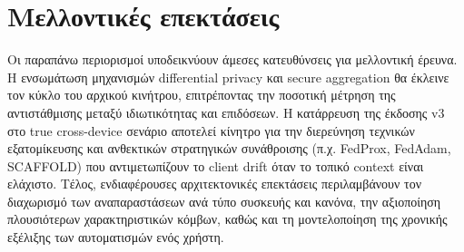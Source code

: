 \section{Μελλοντικές επεκτάσεις}\label{sec:concl-future}
Οι παραπάνω περιορισμοί υποδεικνύουν άμεσες κατευθύνσεις για μελλοντική έρευνα. Η ενσωμάτωση μηχανισμών differential privacy και secure aggregation θα έκλεινε τον κύκλο του αρχικού κινήτρου, επιτρέποντας την ποσοτική μέτρηση της αντιστάθμισης μεταξύ ιδιωτικότητας και επιδόσεων. Η κατάρρευση της έκδοσης v3 στο true cross-device σενάριο αποτελεί κίνητρο για την διερεύνηση τεχνικών εξατομίκευσης και ανθεκτικών στρατηγικών συνάθροισης (π.χ. FedProx, FedAdam, SCAFFOLD) που αντιμετωπίζουν το client drift όταν το τοπικό context είναι ελάχιστο. Τέλος, ενδιαφέρουσες αρχιτεκτονικές επεκτάσεις περιλαμβάνουν τον διαχωρισμό των αναπαραστάσεων ανά τύπο συσκευής και κανόνα, την αξιοποίηση πλουσιότερων χαρακτηριστικών κόμβων, καθώς και τη μοντελοποίηση της χρονικής εξέλιξης των αυτοματισμών ενός χρήστη.